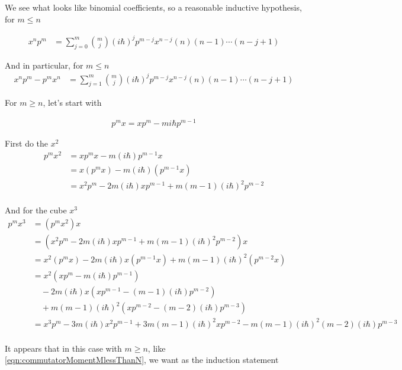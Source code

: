 \documentclass{article}
\begin{document}
We see what looks like binomial coefficients, so a reasonable inductive hypothesis, for $m \le n$

\begin{align}\label{eqn:commutatorMomentMlessThanN}
x^n p^m
&= \sum_{j=0}^m \binom{m}{j} (i \hbar)^j p^{m-j} x^{n-j} (n)(n-1)\cdots(n-j+1)
\end{align}

And in particular, for $m \le n$
\begin{align}
x^n p^m - p^m x^n
&= \sum_{j=1}^m \binom{m}{j} (i \hbar)^j p^{m-j} x^{n-j} (n)(n-1)\cdots(n-j+1) 
\end{align}

For $m \ge n$, let's start with

\begin{align*}
p^m x = x p^m -  m i \hbar p^{m-1} 
\end{align*}

First do the $x^2$
\begin{align*}
p^m x^2 
&= x p^m x -  m (i \hbar) p^{m-1} x \\
&= x (p^m x) -  m (i \hbar) (p^{m-1} x) \\
&= x^2 p^m - 2 m (i \hbar) x p^{m-1} +  m (m-1)(i \hbar)^2 p^{m-2} \\
\end{align*}

And for the cube $x^3$
\begin{align*}
p^m x^3  
&= 
( p^m x^2 ) x \\
&= 
( x^2 p^m - 2 m (i \hbar) x p^{m-1} +  m (m-1)(i \hbar)^2 p^{m-2} ) x \\
&= 
x^2 (p^m x )
- 2 m (i \hbar) x (p^{m-1} x )
+ m (m-1)(i \hbar)^2 (p^{m-2} x) \\
&= 
x^2 ( x p^m -  m (i \hbar) p^{m-1} ) \\
&\quad- 2 m (i \hbar) x ( x p^{m-1} -  (m-1) (i \hbar) p^{m-2} ) \\
&\quad+ m (m-1)(i \hbar)^2 ( x p^{m-2} -  (m-2) (i \hbar) p^{m-3} ) \\
&= 
x^3 p^m 
- 3 m (i \hbar) x^2 p^{m-1} 
+ 3 m (m-1) (i \hbar)^2 x p^{m-2} 
- m (m-1)(i \hbar)^2 (m-2) (i \hbar) p^{m-3} \\
\end{align*}

It appears that in this case with $m \ge n$, like \ref{eqn:commutatorMomentMlessThanN}, we want as the induction statement 
\end{document}
